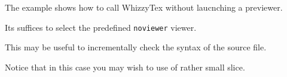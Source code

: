 \documentclass{article}
\begin{document}
The example shows how to call \textsf{WhizzyTex} without laucnching a
previewer. 

Its suffices to select the predefined \texttt{noviewer} viewer.

This may be useful to incrementally check the syntax of the source file.

Notice that in this case you may wish to use of rather small slice.
\end{document}

